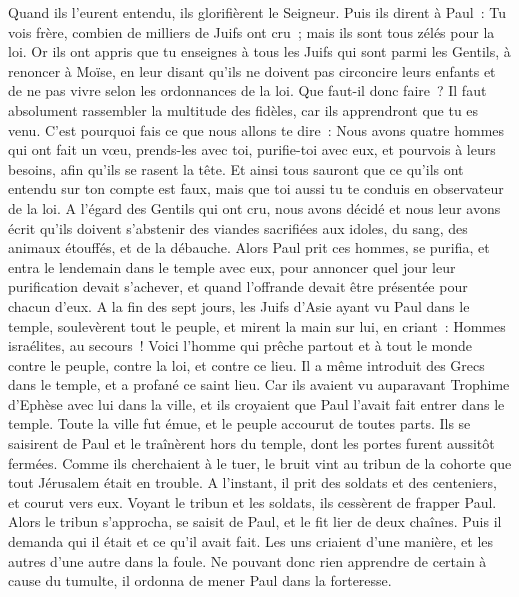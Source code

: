 \begin{multicols}{2}
Quand ils l'eurent entendu, ils glorifièrent le Seigneur. Puis ils dirent à Paul~: Tu vois frère, combien de milliers de Juifs ont cru~; mais ils sont tous zélés pour la loi.
Or ils ont appris que tu enseignes à tous les Juifs qui sont parmi les Gentils, à renoncer à Moïse, en leur disant qu'ils ne doivent pas circoncire leurs enfants et de ne pas vivre selon les ordonnances de la loi.
Que faut-il donc faire~? Il faut absolument rassembler la multitude des fidèles, car ils apprendront que tu es venu.
C'est pourquoi fais ce que nous allons te dire~: Nous avons quatre hommes qui ont fait un vœu,
prends-les avec toi, purifie-toi avec eux, et pourvois à leurs besoins, afin qu'ils se rasent la tête. Et ainsi tous sauront que ce qu'ils ont entendu sur ton compte est faux, mais que toi aussi tu te conduis en observateur de la loi.
A l'égard des Gentils qui ont cru, nous avons décidé et nous leur avons écrit qu'ils doivent s'abstenir des viandes sacrifiées aux idoles, du sang, des animaux étouffés, et de la débauche.
Alors Paul prit ces hommes, se purifia, et entra le lendemain dans le temple avec eux, pour annoncer quel jour leur purification devait s'achever, et quand l'offrande devait être présentée pour chacun d'eux.
A la fin des sept jours, les Juifs d'Asie ayant vu Paul dans le temple, soulevèrent tout le peuple, et mirent la main sur lui,
en criant~: Hommes israélites, au secours~! Voici l'homme qui prêche partout et à tout le monde contre le peuple, contre la loi, et contre ce lieu. Il a même introduit des Grecs dans le temple, et a profané ce saint lieu.
Car ils avaient vu auparavant Trophime d'Ephèse avec lui dans la ville, et ils croyaient que Paul l'avait fait entrer dans le temple.
Toute la ville fut émue, et le peuple accourut de toutes parts. Ils se saisirent de Paul et le traînèrent hors du temple, dont les portes furent aussitôt fermées.
Comme ils cherchaient à le tuer, le bruit vint au tribun de la cohorte que tout Jérusalem était en trouble.
A l'instant, il prit des soldats et des centeniers, et courut vers eux. Voyant le tribun et les soldats, ils cessèrent de frapper Paul.
Alors le tribun s'approcha, se saisit de Paul, et le fit lier de deux chaînes. Puis il demanda qui il était et ce qu'il avait fait.
Les uns criaient d'une manière, et les autres d'une autre dans la foule. Ne pouvant donc rien apprendre de certain à cause du tumulte, il ordonna de mener Paul dans la forteresse.

\end{multicols}
